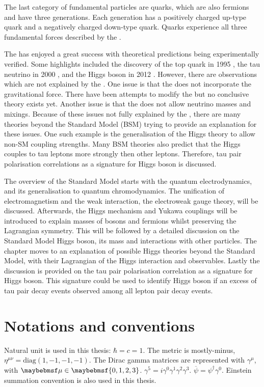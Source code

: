 The last category of fundamental particles are quarks, which are also fermions and have three generations. Each generation has a positively charged up-type quark and a negatively charged down-type quark. Quarks experience all three fundamental forces described by the \SM.

The \SM has enjoyed a great success with theoretical predictions being experimentally verified. Some highlights included the discovery of the top quark in 1995 \cite{Abachi:1995iq}, the tau neutrino in 2000 \cite{Kodama:2000mp}, and the Higgs boson in 2012 \cite{Aad:2012tfa}. However, there are observations which are not explained by the \SM. One issue is that the \SM does not incorporate the gravitational force. There have been attempts to modify the \SM but no conclusive theory exists yet. Another issue is that the \SM does not allow neutrino masses and mixings. Because of these issues not fully explained by the \SM, there are many theories beyond the Standard Model (BSM) trying to provide an explanation for these issues. One such example is the generalisation of the Higgs theory to allow non-SM coupling strengths. Many BSM theories also predict that the Higgs couples to tau leptons more strongly then other leptons. Therefore, tau pair polarisation correlations as a signature for Higgs boson is discussed.

The overview of the Standard Model starts with the quantum electrodynamics, and its generalisation to quantum chromodynamics. The unification of electromagnetism and the weak interaction, the electroweak gauge theory, will be discussed. Afterwards, the Higgs mechanism and Yukawa couplings will be introduced to explain masses of bosons and fermions whilst preserving the Lagrangian symmetry. This will be followed by a detailed discussion on the Standard Model Higgs boson, its mass and interactions with other particles. The chapter moves to an explanation of possible Higgs theories beyond the Standard Model, with their  Lagrangian of the Higgs interaction and observables. Lastly the discussion is provided on  the tau pair polarisation correlation as a signature for Higgs boson. This signature could be used to identify Higgs boson if an excess of tau pair decay events observed among all lepton pair decay events.


\section{Notations and conventions}

Natural unit is used in this thesis: $\hbar = c = 1$. The metric is mostly-minus, $\eta^{\mu\nu} = \text{diag}(1,-1,-1,-1)$. The Dirac gamma matrices are represented with $\gamma^{\mu}$, with $\mu\in\braces{0,1,2,3}$. $\gamma^5 = i \gamma^{0}\gamma^{1}\gamma^{2}\gamma^{3}$. $\overline{\psi} = \psi^{\dagger}\gamma^0$. Einstein summation convention is also used in this thesis.

